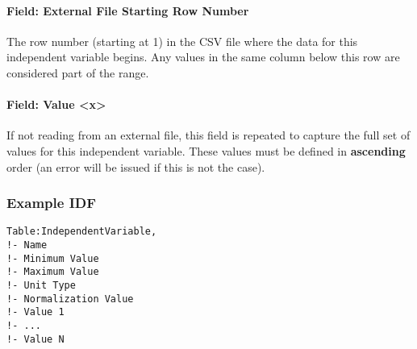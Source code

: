 \paragraph{Field: External File Starting Row
Number}\label{field-external-file-starting-row-number-1}

The row number (starting at 1) in the CSV file where the data for this
independent variable begins. Any values in the same column below this
row are considered part of the range.

\paragraph{Field: Value
\textless{}x\textgreater{}}\label{field-value-x}

If not reading from an external file, this field is repeated to capture
the full set of values for this independent variable. These values must
be defined in \textbf{ascending} order (an error will be issued if this
is not the case).

\subsubsection{Example IDF}\label{example-idf-2}

\begin{verbatim}
Table:IndependentVariable,
!- Name
!- Minimum Value
!- Maximum Value
!- Unit Type
!- Normalization Value
!- Value 1
!- ...
!- Value N
\end{verbatim}
